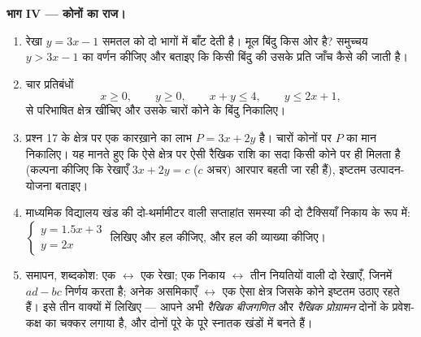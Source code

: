\begin{problem}
\medskip
\noindent\textbf{भाग IV --- कोनों का राज।}
\begin{enumerate}[resume]
  \item रेखा $y = 3x - 1$ समतल को दो भागों में बाँट देती है। मूल बिंदु किस ओर है?
        समुच्चय $y > 3x - 1$ का वर्णन कीजिए और बताइए कि किसी बिंदु की उसके प्रति
        जाँच कैसे की जाती है।
  \item चार प्रतिबंधों
        \[
        x \geq 0, \qquad y \geq 0, \qquad x + y \leq 4,
        \qquad y \leq 2x + 1,
        \]
        से परिभाषित क्षेत्र खींचिए और उसके चारों कोने के बिंदु निकालिए।
  \item प्रश्न 17 के क्षेत्र पर एक कारख़ाने का लाभ $P = 3x + 2y$ है। चारों कोनों पर
        $P$ का मान निकालिए। यह मानते हुए कि ऐसे क्षेत्र पर ऐसी रैखिक
        राशि का  सदा किसी कोने पर ही मिलता है (कल्पना कीजिए कि रेखाएँ
        $3x + 2y = c$ ($c$ अचर) आरपार बहती जा रही हैं), इष्टतम उत्पादन-योजना बताइए।
  \item माध्यमिक विद्यालय खंड की दो-थर्मामीटर वाली सप्ताहांत समस्या की दो
        टैक्सियाँ निकाय के रूप में: $\begin{cases} y = 1.5x + 3 \\ y = 2x \end{cases}$ लिखिए और हल कीजिए, और हल की
        व्याख्या कीजिए।
  \item समापन, शब्दकोश: एक  $\leftrightarrow$ एक रेखा; एक निकाय $\leftrightarrow$ तीन
        नियतियों वाली दो रेखाएँ, जिनमें $ad - bc$ निर्णय करता है; अनेक असमिकाएँ
        $\leftrightarrow$ एक ऐसा क्षेत्र जिसके कोने इष्टतम उठाए रहते हैं। इसे तीन
        वाक्यों में लिखिए --- आपने अभी \emph{रैखिक बीजगणित} और \emph{रैखिक
        प्रोग्रामन} दोनों के प्रवेश-कक्ष का चक्कर लगाया है, और दोनों पूरे
        के पूरे स्नातक खंडों में बनते हैं।
\end{enumerate}
\end{problem}

